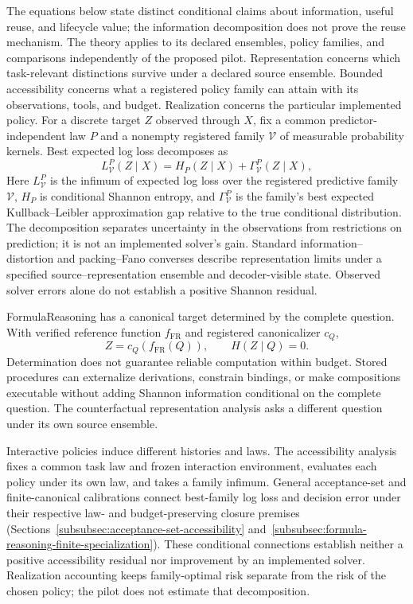 \documentclass[10pt]{article} %
\providecommand{\1}{\mathbf{1}}  %
\theoremstyle{remark}
\theoremstyle{definition}
\begin{document}
The equations below state distinct conditional claims about information,
useful reuse, and lifecycle value; the information decomposition does not
prove the reuse mechanism. The theory applies to its declared ensembles,
policy families, and comparisons independently of the proposed pilot.
Representation concerns which task-relevant distinctions survive under a
declared source ensemble. Bounded accessibility concerns what a registered
policy family can attain with its observations, tools, and budget.
Realization concerns the particular implemented policy. For a discrete
target $Z$ observed through $X$, fix a common predictor-independent law
$P$ and a nonempty registered family $\mathcal V$ of measurable
probability kernels. Best expected log loss decomposes as
\[
L_{\mathcal V}^{P}(Z\mid X)
=H_P(Z\mid X)+\Gamma_{\mathcal V}^{P}(Z\mid X),
\]
Here $L_{\mathcal V}^{P}$ is the infimum of expected log loss over the
registered predictive family $\mathcal V$, $H_P$ is conditional Shannon
entropy, and $\Gamma_{\mathcal V}^{P}$ is the family's best expected
Kullback--Leibler approximation gap relative to the true conditional
distribution. The decomposition separates uncertainty in the observations
from restrictions on prediction; it is not an implemented solver's gain.
Standard information--distortion and packing--Fano converses
describe representation limits under a specified source--representation
ensemble and decoder-visible state. Observed solver errors alone do not
establish a positive Shannon residual.

FormulaReasoning \citep{li2026formulareasoning} has a canonical target
determined by the complete question. With verified reference function
$f_{\mathrm{FR}}$ and registered canonicalizer $c_Q$,
\begin{equation}
Z=c_Q\!\left(f_{\mathrm{FR}}(Q)\right),
\qquad H(Z\mid Q)=0.
\label{eq:intro-formulareasoning-determinacy}
\end{equation}
Determination does not guarantee reliable computation within budget.
Stored procedures can externalize derivations, constrain bindings, or make
compositions executable without adding Shannon information conditional on
the complete question. The counterfactual representation analysis asks a
different question under its own source ensemble.

Interactive policies induce different histories and laws. The
accessibility analysis fixes a common task law and frozen interaction
environment, evaluates each policy under its own law, and takes a family
infimum. General acceptance-set and finite-canonical calibrations connect
best-family log loss and decision error under their respective law- and
budget-preserving closure premises
(Sections~\ref{subsubsec:acceptance-set-accessibility}
and~\ref{subsubsec:formula-reasoning-finite-specialization}). These
conditional connections establish neither a positive accessibility
residual nor improvement by an implemented solver. Realization accounting
keeps family-optimal risk separate from the risk of the chosen policy;
the pilot does not estimate that decomposition.
\end{document}
